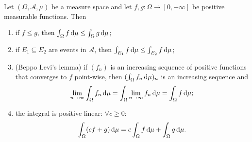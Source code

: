 \begin{proposition} \label{propertiesIntegralPositiveFunctions}
Let $(\Omega, \mathcal{A}, \mu)$ be a measure space and let $f,g:\Omega\to[0,+\infty]$ be positive measurable functions. Then
\begin{enumerate}
\item if $f\leq g$, then $\int_\Omega f\operatorname{d \!}{\mu} \leq \int_\Omega g\operatorname{d \!}{\mu}$;
\item if $E_1\subseteq E_2$ are events in $\mathcal{A}$, then $\int_{E_1}f\operatorname{d \!}{\mu} \leq \int_{E_2}f\operatorname{d \!}{\mu}$;
\item \textup{(Beppo Levi's lemma)} if $(f_n)$  is an increasing sequence of positive functions that converges to $f$ point-wise, then $(\int_\Omega f_n\operatorname{d \!}{\mu})_n$ is an increasing sequence and
\[ \lim_{n\to\infty}\int_\Omega f_n\operatorname{d \!}{\mu} = \int_\Omega \lim_{n\to\infty}f_n\operatorname{d \!}{\mu} = \int_\Omega f\operatorname{d \!}{\mu}; \]
\item the integral is positive linear: $\forall c\geq 0$:
\[ \int_\Omega(cf+g)\operatorname{d \!}{\mu} = c\int_\Omega f\operatorname{d \!}{\mu} + \int_\Omega g\operatorname{d \!}{\mu}. \]
\end{enumerate}
\end{proposition}
